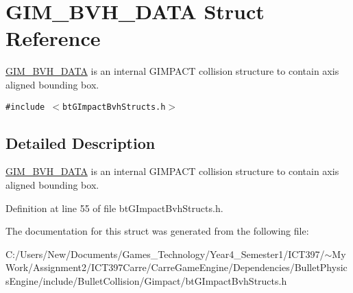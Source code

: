 \hypertarget{struct_g_i_m___b_v_h___d_a_t_a}{
\section{GIM\_\-BVH\_\-DATA Struct Reference}
\label{struct_g_i_m___b_v_h___d_a_t_a}
}
\hyperlink{struct_g_i_m___b_v_h___d_a_t_a}{GIM\_\-BVH\_\-DATA} is an internal GIMPACT collision structure to contain axis aligned bounding box.  


{\tt \#include $<$btGImpactBvhStructs.h$>$}



\subsection{Detailed Description}
\hyperlink{struct_g_i_m___b_v_h___d_a_t_a}{GIM\_\-BVH\_\-DATA} is an internal GIMPACT collision structure to contain axis aligned bounding box. 

Definition at line 55 of file btGImpactBvhStructs.h.

The documentation for this struct was generated from the following file:\begin{CompactItemize}
\item 
C:/Users/New/Documents/Games\_\-Technology/Year4\_\-Semester1/ICT397/$\sim$My Work/Assignment2/ICT397Carre/CarreGameEngine/Dependencies/BulletPhysicsEngine/include/BulletCollision/Gimpact/btGImpactBvhStructs.h\end{CompactItemize}
